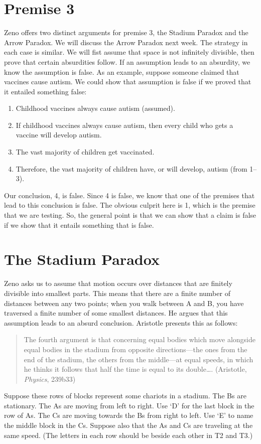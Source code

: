 \documentclass[oneside]{article}
\begin{document}
\section{Premise 3}\label{premise-3}

Zeno offers two distinct arguments for premise 3, the Stadium Paradox and the Arrow Paradox. We will discuss the Arrow Paradox next week.  The strategy in each case is similar. We will fist assume that space is not infinitely divisible, then prove that certain absurdities follow. If an assumption leads to an absurdity, we know the assumption is false. As an example, suppose someone claimed that vaccines cause autism. We could show that assumption is false if we proved that it entailed something false: 

\begin{enumerate}
\item  Childhood vaccines always cause autism (assumed). 
\item If childhood vaccines always cause autism, then every child who gets a vaccine will develop autism. 
\item The vast majority of children get vaccinated. 
\item Therefore, the vast majority of children have, or will develop, autism (from 1--3). 
\end{enumerate}
Our conclusion, 4, is false. Since 4 is false, we know that one of the premises that lead to this conclusion is false. The obvious culprit here is 1, which is the premise that we are testing. So, the general point is that we can show that a claim is false if we show that it entails something that is  false. 


\section{The Stadium Paradox}\label{stadium-paradox}

Zeno asks us to assume that motion occurs over distances that are finitely divisible into smallest parts. This means that there are a finite number of distances between any two points; when you walk between A and B, you have traversed a finite number of some smallest distances. He argues that this assumption leads to an absurd conclusion. Aristotle presents this as follows: 



\begin{quote}
The fourth argument is that concerning equal bodies which move alongside equal bodies in the stadium from opposite directions---the ones from the end of the stadium, the others from the middle---at equal speeds, in which he thinks it follows that half the time is equal to its
double\ldots{}. (Aristotle, \emph{Physics}, 239b33)
\end{quote}
Suppose these rows of blocks represent some chariots in a stadium. The
Bs are stationary. The As are moving from left to right. Use `D' for the last block in the row of As. The Cs are moving towards the Bs from right to left. Use `E' to name the middle block in the Cs. Suppose also that the As and Cs are traveling at the same speed. (The letters in each row should be beside each other in T2 and T3.)
\end{document}
